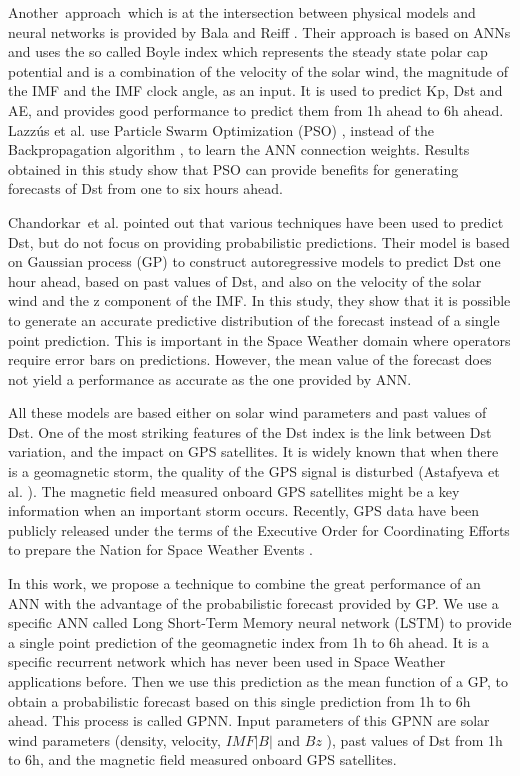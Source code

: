 Another\ approach\ which is at the intersection between physical models and neural networks is provided by 
Bala and Reiff \citet{Bala2012}. Their approach is based on ANNs and uses the so called Boyle index which represents 
the steady state polar cap potential and is a combination of the velocity of the solar wind, the magnitude of 
the IMF and the IMF clock angle, as an input. It is used to predict Kp, Dst and AE, and provides good performance 
to predict them from 1h ahead to 6h ahead. Lazz\'us et al. \citet{Lazzus} use 
Particle Swarm Optimization (PSO) \citet{eberhart1995new}, instead of the Backpropagation algorithm 
\citet{rummelhart1986parallel}, to learn the ANN connection weights. Results obtained in this study show 
that PSO can provide benefits for generating forecasts of Dst from one to six hours ahead.

Chandorkar\ et al. \citet{ChandorkarDst} pointed out that various techniques have been used to predict Dst, but do not 
focus on  providing probabilistic predictions. Their model is based on Gaussian process (GP) to construct 
autoregressive models to predict Dst one hour ahead, based on past values of Dst, and also on the velocity of 
the solar wind and the z component of the IMF. In this study, they show that it is possible to generate an 
accurate predictive distribution of the forecast instead of a single point prediction. This is important in the 
Space Weather domain where operators require error bars on predictions. However, the mean value of the forecast 
does not yield a performance as accurate as the one provided by ANN. 

All these models are based either on solar wind parameters and past values of Dst. One of the most striking features 
of the Dst index is the link between Dst variation, and the impact on GPS satellites. It is widely known that when 
there is a geomagnetic storm, the quality of the GPS signal is disturbed 
(Astafyeva et al. \citet{astafyeva2014geomagnetic}). The magnetic field measured onboard GPS satellites might be a 
key information when an important storm occurs. Recently, GPS data have been publicly released under the terms 
of the Executive Order for Coordinating Efforts to prepare the Nation for 
Space Weather Events \citet{morley2017energetic}. 

In this work, we propose a technique to combine the great performance of an ANN with the advantage of the 
probabilistic forecast provided by GP. We use a specific ANN called Long Short-Term Memory neural network (LSTM) 
\citet{hochreiter1997long} to provide a single point prediction of the geomagnetic index from 1h to 6h ahead. 
It is a specific recurrent network which has never been used in Space Weather applications before. Then we use this 
prediction as the mean function of a GP, to obtain a probabilistic forecast based on this single prediction from 
1h to 6h ahead. This process is called GPNN. Input parameters of this GPNN are solar wind parameters 
(density, velocity,  \( IMF  \vert B \vert  \)  and \(  Bz \) ), past values of Dst from 1h to 6h, and the 
magnetic field measured onboard GPS satellites. 

